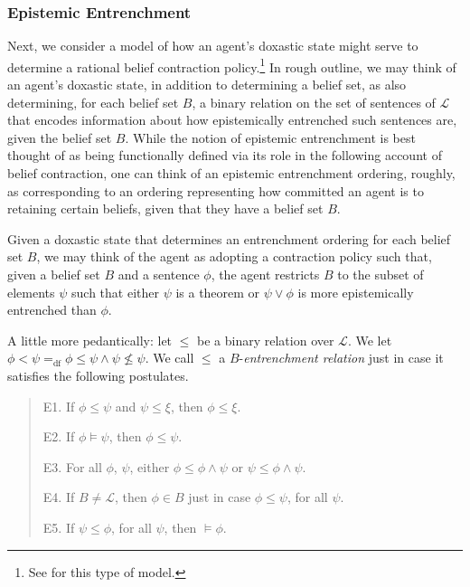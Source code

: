 \subsubsection{Epistemic Entrenchment}\label{caie-section2-3-2}

Next, we consider a model of how an agent's doxastic state might serve to determine a rational belief contraction policy.\footnote{See \citet{GardenforsMakinson1} for this type of model.}
In rough outline, we may think of an agent's doxastic state, in addition to determining a belief set, as also determining, for each belief set $B$, a binary relation on the set of sentences of $\mathcal{L}$ that encodes information about how epistemically entrenched such sentences are, given the belief set $B$.
While the notion of epistemic entrenchment is best thought of as being functionally defined via its role in the following account of belief contraction, one can think of an epistemic entrenchment ordering, roughly, as corresponding to an ordering representing how committed an agent is to retaining certain beliefs, given that they have a belief set $B$.

Given a doxastic state that determines an entrenchment ordering for each belief set $B$, we may think of the agent as adopting a contraction policy such that, given a belief set $B$ and a sentence $\phi$, the agent restricts $B$ to the subset of elements $\psi$ such that either $\psi$ is a theorem or $\psi \vee \phi$ is more epistemically entrenched than $\phi$.

A little more pedantically: let $\leq$ be a binary relation over $\mathcal{L}$.
We let $\phi < \psi =_{\text{df}} \phi \leq \psi \wedge \psi \not \leq \psi$. 
We call $\leq$ a $B$-\textit{entrenchment relation} just in case it satisfies the following postulates.
\begin{quote}
\textsc{E1.}\; If $\phi \leq \psi$ and $\psi \leq \xi$, then $\phi \leq \xi$.

\textsc{E2.}\; If $\phi \models \psi$, then $\phi \leq \psi$.

\textsc{E3.}\; For all $\phi$, $\psi$, either $\phi \leq \phi \wedge \psi$ or $\psi \leq \phi \wedge \psi$.

\textsc{E4.}\; If $B \neq \mathcal{L}$, then $\phi \in B$ just in case $\phi \leq \psi$, for all $\psi$.

\textsc{E5.}\; If $\psi \leq \phi$, for all $\psi$, then $\models \phi$.
\end{quote}

